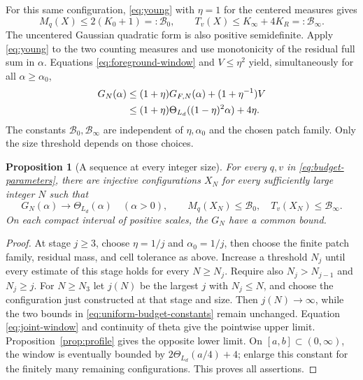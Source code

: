 \documentclass[11pt,a4paper]{article}
\newtheorem{proposition}[theorem]{Proposition}
\theoremstyle{definition}
\numberwithin{equation}{section}
\begin{document}
For this same configuration, \eqref{eq:young} with $\eta=1$ for the centered measures gives
\begin{equation}\label{eq:uniform-budget-constants}
 M_q(X)\le2(K_0+1)=:\mathcal B_0,
 \qquad T_v(X)\le K_\infty+4K_R=:\mathcal B_\infty.
\end{equation}
The uncentered Gaussian quadratic form is also positive semidefinite. Apply \eqref{eq:young} to the two counting measures and use monotonicity of the residual full sum in $\alpha$. Equations \eqref{eq:foreground-window} and $V\le\eta^2$ yield, simultaneously for all $\alpha\ge\alpha_0$,
\begin{align}
 G_N(\alpha)&\le(1+\eta)G_{F,N}(\alpha)+(1+\eta^{-1})V\notag\\
 &\le(1+\eta)\Theta_{L_d}((1-\eta)^2\alpha)+4\eta.
                                                       \label{eq:joint-window}
\end{align}
The constants $\mathcal B_0,\mathcal B_\infty$ are independent of $\eta,\alpha_0$ and the chosen patch family. Only the size threshold depends on those choices.

\begin{proposition}[A sequence at every integer size]\label{prop:common-sequence}
For every $q,v$ in \eqref{eq:budget-parameters}, there are injective configurations $X_N$ for every sufficiently large integer $N$ such that
\begin{equation}\label{eq:common-sequence}
 G_N(\alpha)\longrightarrow\Theta_{L_d}(\alpha)\quad(\alpha>0),
 \qquad M_q(X_N)\le\mathcal B_0,\quad T_v(X_N)\le\mathcal B_\infty.
\end{equation}
On each compact interval of positive scales, the $G_N$ have a common bound.
\end{proposition}
\begin{proof}
At stage $j\ge3$, choose $\eta=1/j$ and $\alpha_0=1/j$, then choose the finite patch family, residual mass, and cell tolerance as above. Increase a threshold $N_j$ until every estimate of this stage holds for every $N\ge N_j$. Require also $N_j>N_{j-1}$ and $N_j\ge j$. For $N\ge N_3$ let $j(N)$ be the largest $j$ with $N_j\le N$, and choose the configuration just constructed at that stage and size. Then $j(N)\to\infty$, while the two bounds in \eqref{eq:uniform-budget-constants} remain unchanged. Equation \eqref{eq:joint-window} and continuity of theta give the pointwise upper limit. Proposition~\ref{prop:profile} gives the opposite lower limit. On $[a,b]\subset(0,\infty)$, the window is eventually bounded by $2\Theta_{L_d}(a/4)+4$; enlarge this constant for the finitely many remaining configurations. This proves all assertions.
\end{proof}
\end{document}
